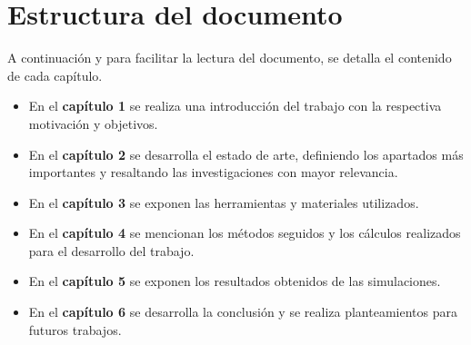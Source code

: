 \section{Estructura del documento}

A continuación y para facilitar la lectura del documento, se detalla el contenido de cada capítulo.

\begin{itemize}
\item En el \textbf{capítulo 1} se realiza una introducción del trabajo con la respectiva motivación y objetivos.
\item En el \textbf{capítulo 2} se desarrolla el estado de arte, definiendo los apartados más importantes y resaltando las investigaciones con mayor relevancia.
\item En el \textbf{capítulo 3} se exponen las herramientas y materiales utilizados.
\item En el \textbf{capítulo 4} se mencionan los métodos seguidos y los cálculos realizados para el desarrollo del trabajo.
\item En el \textbf{capítulo 5} se exponen los resultados obtenidos de las simulaciones.
\item En el \textbf{capítulo 6} se desarrolla la conclusión y se realiza planteamientos para futuros trabajos.
\end{itemize}

